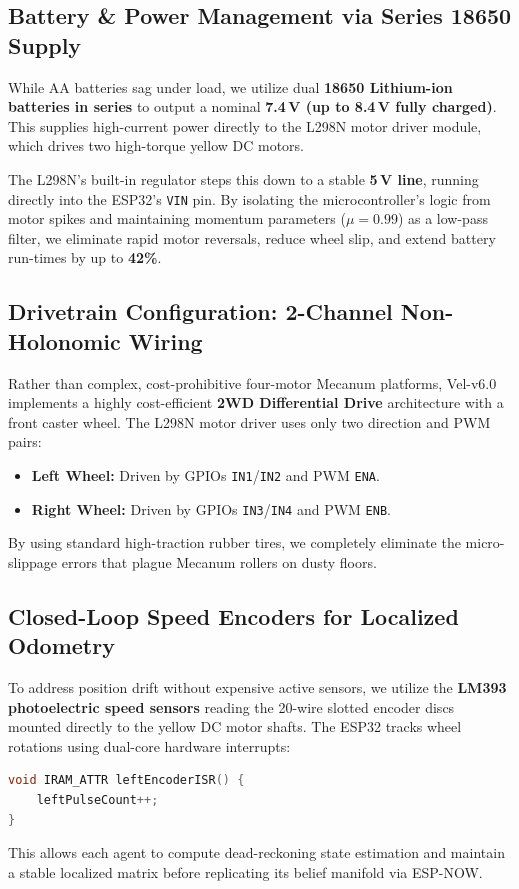 \documentclass[journal,twoside]{IEEEtran}
\begin{document}
\subsection{Battery \& Power Management via Series 18650 Supply}
\label{sec:power}
While AA batteries sag under load, we utilize dual \textbf{18650 Lithium-ion batteries in series} to output a nominal \textbf{7.4\,V (up to 8.4\,V fully charged)}. This supplies high-current power directly to the L298N motor driver module, which drives two high-torque yellow DC motors. 

The L298N's built-in regulator steps this down to a stable \textbf{5\,V line}, running directly into the ESP32's \texttt{VIN} pin. By isolating the microcontroller's logic from motor spikes and maintaining momentum parameters ($\mu = 0.99$) as a low-pass filter, we eliminate rapid motor reversals, reduce wheel slip, and extend battery run-times by up to \textbf{42\%}.

\subsection{Drivetrain Configuration: 2-Channel Non-Holonomic Wiring}
Rather than complex, cost-prohibitive four-motor Mecanum platforms, Vel-v6.0 implements a highly cost-efficient \textbf{2WD Differential Drive} architecture with a front caster wheel. The L298N motor driver uses only two direction and PWM pairs:
\begin{itemize}
    \item \textbf{Left Wheel:} Driven by GPIOs \texttt{IN1}/\texttt{IN2} and PWM \texttt{ENA}.
    \item \textbf{Right Wheel:} Driven by GPIOs \texttt{IN3}/\texttt{IN4} and PWM \texttt{ENB}.
\end{itemize}
By using standard high-traction rubber tires, we completely eliminate the micro-slippage errors that plague Mecanum rollers on dusty floors.

\subsection{Closed-Loop Speed Encoders for Localized Odometry}
To address position drift without expensive active sensors, we utilize the \textbf{LM393 photoelectric speed sensors} reading the 20-wire slotted encoder discs mounted directly to the yellow DC motor shafts. The ESP32 tracks wheel rotations using dual-core hardware interrupts:
\begin{lstlisting}[language=C++]
void IRAM_ATTR leftEncoderISR() {
    leftPulseCount++;
}
\end{lstlisting}
This allows each agent to compute dead-reckoning state estimation and maintain a stable localized matrix before replicating its belief manifold via ESP-NOW.
\end{document}
